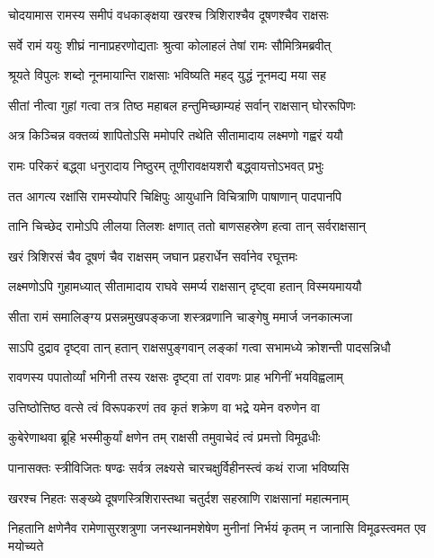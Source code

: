 \twolineshloka
{चोदयामास रामस्य समीपं वधकाङ्क्षया}
{खरश्च त्रिशिराश्चैव दूषणश्चैव राक्षसः} %

\twolineshloka
{सर्वे रामं ययुः शीघ्रं नानाप्रहरणोद्यताः}
{श्रुत्वा कोलाहलं तेषां रामः सौमित्रिमब्रवीत्} %

\twolineshloka
{श्रूयते विपुलः शब्दो नूनमायान्ति राक्षसाः}
{भविष्यति महद् युद्धं नूनमद्य मया सह} %

\twolineshloka
{सीतां नीत्वा गुहां गत्वा तत्र तिष्ठ महाबल}
{हन्तुमिच्छाम्यहं सर्वान् राक्षसान् घोररूपिणः} %

\twolineshloka
{अत्र किञ्चिन्न वक्तव्यं शापितोऽसि ममोपरि}
{तथेति सीतामादाय लक्ष्मणो गह्वरं ययौ} %

\twolineshloka
{रामः परिकरं बद्\mbox{}ध्वा धनुरादाय निष्ठुरम्}
{तूणीरावक्षयशरौ बद्\mbox{}ध्वायत्तोऽभवत् प्रभुः} %

\twolineshloka
{तत आगत्य रक्षांसि रामस्योपरि चिक्षिपुः}
{आयुधानि विचित्राणि पाषाणान् पादपानपि} %

\twolineshloka
{तानि चिच्छेद रामोऽपि लीलया तिलशः क्षणात्}
{ततो बाणसहस्रेण हत्वा तान् सर्वराक्षसान्} %

\twolineshloka
{खरं त्रिशिरसं चैव दूषणं चैव राक्षसम्}
{जघान प्रहरार्धेन सर्वानेव रघूत्तमः} %

\twolineshloka
{लक्ष्मणोऽपि गुहामध्यात् सीतामादाय राघवे}
{समर्प्य राक्षसान् दृष्ट्वा हतान् विस्मयमाययौ} %

\twolineshloka
{सीता रामं समालिङ्ग्य प्रसन्नमुखपङ्कजा}
{शस्त्रव्रणानि चाङ्गेषु ममार्ज जनकात्मजा} %

\twolineshloka
{साऽपि दुद्राव दृष्ट्वा तान् हतान् राक्षसपुङ्गवान्}
{लङ्कां गत्वा सभामध्ये क्रोशन्ती पादसन्निधौ} %

\twolineshloka
{रावणस्य पपातोर्व्यां भगिनी तस्य रक्षसः}
{दृष्ट्वा तां रावणः प्राह भगिनीं भयविह्वलाम्} %

\twolineshloka
{उत्तिष्ठोत्तिष्ठ वत्से त्वं विरूपकरणं तव}
{कृतं शक्रेण वा भद्रे यमेन वरुणेन वा} %

\twolineshloka
{कुबेरेणाथवा ब्रूहि भस्मीकुर्यां क्षणेन तम्}
{राक्षसी तमुवाचेदं त्वं प्रमत्तो विमूढधीः} %

\twolineshloka
{पानासक्तः स्त्रीविजितः षण्ढः सर्वत्र लक्ष्यसे}
{चारचक्षुर्विहीनस्त्वं कथं राजा भविष्यसि} %

\twolineshloka
{खरश्च निहतः सङ्ख्ये दूषणस्त्रिशिरास्तथा}
{चतुर्दश सहस्राणि राक्षसानां महात्मनाम्} %

\threelineshloka
{निहतानि क्षणेनैव रामेणासुरशत्रुणा}
{जनस्थानमशेषेण मुनीनां निर्भयं कृतम्}
{न जानासि विमूढस्त्वमत एव मयोच्यते} %

